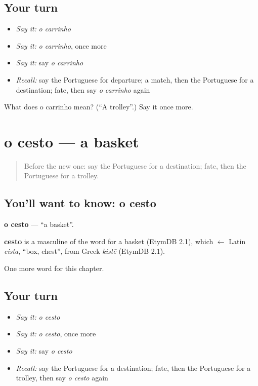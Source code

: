 \subsection*{Your turn}
\begin{itemize}
\raggedright
  \item \emph{Say it:} \emph{o carrinho}
  \item \emph{Say it:} \emph{o carrinho}, once more
  \item \emph{Say it:} say \emph{o carrinho}
  \item \emph{Recall:} say the Portuguese for departure; a match, then the Portuguese for a destination; fate, then say \emph{o carrinho} again
\end{itemize}

\begin{tcolorbox}[breakable,colback=teal!4,colframe=teal!35!black,title={Before you move on}]
What does o carrinho mean? (\textquotedblleft{}A trolley\textquotedblright{}.) Say it once more.
\end{tcolorbox}
\section[o cesto]{o cesto — a basket}

\label{lesson:PT-C167-cesto}



\begin{quote}
Before the new one: say the Portuguese for a destination; fate, then the Portuguese for a trolley.
\end{quote}

\subsection*{You'll want to know: o cesto}
\textbf{o cesto} — \textquotedblleft{}a basket\textquotedblright{}.

\begin{cousinweb}
\textbf{cesto} is a masculine of the word for a basket (EtymDB 2.1), which $\leftarrow$ Latin \emph{cista}, \textquotedblleft{}box, chest\textquotedblright{}, from Greek \emph{kistē} (EtymDB 2.1).
\end{cousinweb}

\begin{grammarlens}[title={What you've built}]
One more word for this chapter.
\end{grammarlens}

\subsection*{Your turn}
\begin{itemize}
\raggedright
  \item \emph{Say it:} \emph{o cesto}
  \item \emph{Say it:} \emph{o cesto}, once more
  \item \emph{Say it:} say \emph{o cesto}
  \item \emph{Recall:} say the Portuguese for a destination; fate, then the Portuguese for a trolley, then say \emph{o cesto} again
\end{itemize}

